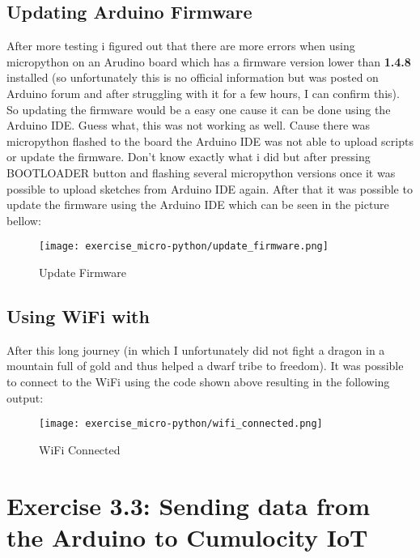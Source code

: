 \subsection{Updating Arduino Firmware}

After more testing i figured out that there are more errors when using micropython on an Arudino board 
which has a firmware version lower than \textbf{1.4.8} installed (so unfortunately this is no official information 
but was posted on Arduino forum and after struggling with it for a few hours, I can confirm this).
\newline
\newline
So updating the firmware would be a easy one cause it can be done using the Arduino IDE.
Guess what, this was not working as well. Cause there was micropython flashed to the board the Arduino IDE 
was not able to upload scripts or update the firmware. Don't know exactly what i did but after 
pressing BOOTLOADER button and flashing several micropython versions once it was possible to upload 
sketches from Arduino IDE again. After that it was possible to update the firmware using the Arduino IDE 
which can be seen in the picture bellow:
\begin{figure}[H]
  \centering
  \texttt{[image: exercise\_micro-python/update\_firmware.png]}
  \caption{Update Firmware}
\end{figure}

\subsection{Using WiFi with }

After this long journey (in which I unfortunately did not fight a dragon in a mountain full of gold 
and thus helped a dwarf tribe to freedom). It was possible to connect to the WiFi using the code 
shown above resulting in the following output:

\begin{figure}[H]
  \centering
  \texttt{[image: exercise\_micro-python/wifi\_connected.png]}
  \caption{WiFi Connected}
\end{figure}

\section{Exercise 3.3: Sending data from the Arduino to Cumulocity IoT}

